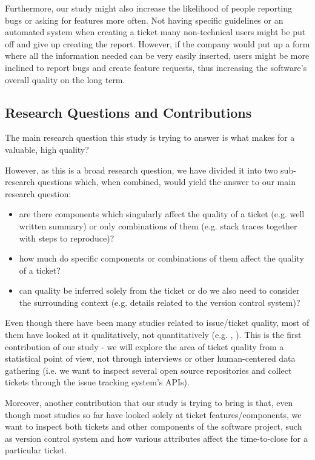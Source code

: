 \documentclass{mprop}
\begin{document}
Furthermore, our study might also increase the likelihood of people
reporting bugs or asking for features more often. Not having specific 
guidelines or an automated system when creating a ticket many 
non-technical users might be put off and give up creating the report. 
However, if the company would put up a form where all the information
needed can be very easily inserted, users might be more inclined 
to report bugs and create feature requests, thus increasing the 
software's overall quality on the long term.

\subsection{Research Questions and Contributions}

The main research question this study is trying to answer is 
what makes for a valuable, high quality?

However, as this is a broad research question, we have divided it into
two sub-research questions which, when combined, would yield the 
answer to our main research question:
  \begin{itemize}
    \item are there components which singularly affect the quality
      of a ticket (e.g. well written summary) or only combinations of them 
      (e.g. stack traces together with steps to reproduce)?
    \item how much do specific components or combinations of them 
      affect the quality of a ticket?
    \item can quality be inferred solely from the ticket or do we also
      need to consider the surrounding context (e.g. details related to
      the version control system)?
  \end{itemize}

Even though there have been many studies related to issue/ticket quality,
most of them have looked at it qualitatively, not quantitatively (e.g. 
\citet{bettenburg2008makes}, \citet{bettenburg2007quality}). This is 
the first contribution of our study - we will explore the area of 
ticket quality from a statistical point of view, not through interviews
or other human-centered data gathering (i.e. we want to inspect several
open source repositories and collect tickets through the issue tracking
system's APIs).

Moreover, another contribution that our study is trying to bring is that,
even though most studies so far have looked solely at ticket 
features/components, we want to inspect both tickets and other components
of the software project, such as version control system and how various
attributes affect the time-to-close for a particular ticket. 
\end{document}
